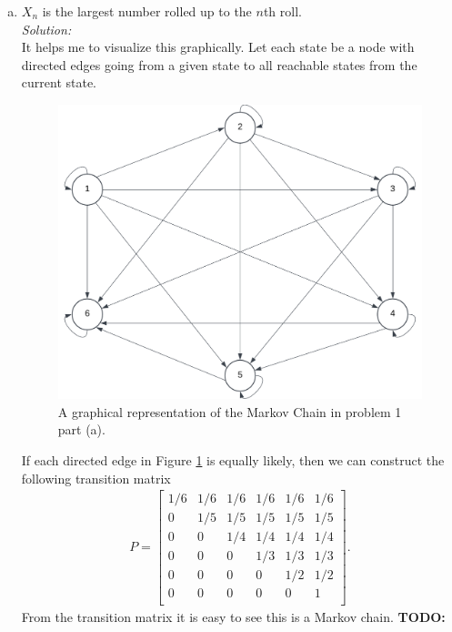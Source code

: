 \documentclass[10pt]{amsart}
\begin{document}
\begin{enumerate}[(a)]
\item $X_n$ is the largest number rolled up to the $n$th roll. \\

\noindent
\textit{Solution:} \\
It helps me to visualize this graphically. 
Let each state be a node with directed edges going from a given state to all reachable states from the current state.
\begin{figure}[h]
	\centering
	\includegraphics[scale=0.5]{one_part_a_markov_graph.png}
	\caption{
		A graphical representation of the Markov Chain in problem 1 part (a).
	}\label{fig:f1}
\end{figure}
If each directed edge in Figure \ref{fig:f1} is equally likely, then we can construct the following transition matrix
\begin{align*}
P = 
\begin{bmatrix}
1 /6 & 1 /6 & 1 /6 & 1 /6 & 1/6 & 1/6 \\
0 & 1/5 & 1/5 & 1/5 & 1/5 & 1 /5 \\
0 & 0 & 1/4 & 1/4 & 1/4 & 1/4 \\
0 & 0 & 0 & 1/3 & 1/3 & 1/3 \\
0 & 0 & 0 & 0 & 1/2 & 1/2 \\
0 & 0 & 0 & 0 & 0 & 1 \\
\end{bmatrix}.
\end{align*}
From the transition matrix it is easy to see this is a Markov chain.
\textbf{TODO:} \\
\begin{align*}
\end{align*}



\end{enumerate}
\end{document}

